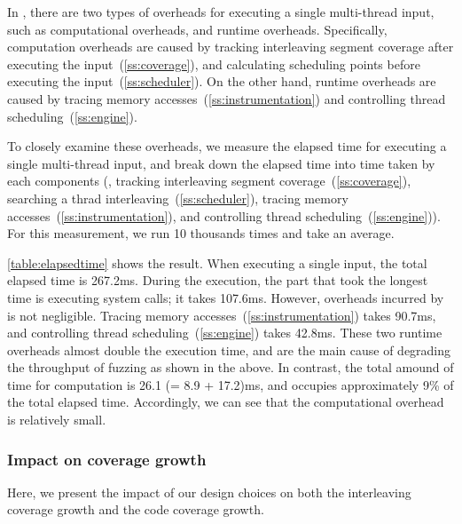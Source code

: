 %
\begin{table}[t]
  \centering
  
  \caption{
    Elapsed time (ms) for executing one multi-thread input. We
    decompose the elapsed time into the system call execution
    (\texttt{Exec. syscall}), \sys's computational overheads
    (\texttt{Comp. overhead}) and runtime overhead (\texttt{Runtime
      overhead}).}
  \label{table:elapsedtime}
\end{table}
%
In \sys, there are two types of overheads for executing a single
multi-thread input, such as computational overheads, and runtime
overheads.
%
Specifically, computation overheads are caused by tracking
interleaving segment coverage after executing the
input~(\autoref{ss:coverage}), and calculating scheduling points
before executing the input~(\autoref{ss:scheduler}).
%
On the other hand, runtime overheads are caused by tracing memory
accesses~(\autoref{ss:instrumentation}) and controlling thread
scheduling~(\autoref{ss:engine}).


To closely examine these overheads, we measure the elapsed time for
executing a single multi-thread input, and break down the elapsed time
into time taken by each components (\ie, tracking interleaving segment
coverage~(\autoref{ss:coverage}), searching a thrad
interleaving~(\autoref{ss:scheduler}), tracing memory
accesses~(\autoref{ss:instrumentation}), and controlling thread
scheduling~(\autoref{ss:engine})).
%
For this measurement, we run 10 thousands times and take an average.




\autoref{table:elapsedtime} shows the result. When executing a single
input, the total elapsed time is 267.2ms.
%
During the execution, the part that took the longest time is executing
system calls; it takes 107.6ms.
%
However, overheads incurred by \sys is not negligible. Tracing memory
accesses~(\autoref{ss:instrumentation}) takes 90.7ms, and controlling
thread scheduling~(\autoref{ss:engine}) takes 42.8ms. These two
runtime overheads almost double the execution time, and are the main
cause of degrading the throughput of fuzzing as shown in the above.
%
In contrast, the total amound of time for computation is 26.1 (= 8.9 +
17.2)ms, and occupies approximately 9\% of the total elapsed time.
%
Accordingly, we can see that the computational overhead is relatively
small.



\subsubsection{Impact on coverage growth}
\label{sss:component}
%
Here, we present the impact of our design choices on both the
interleaving coverage growth and the code coverage growth.


